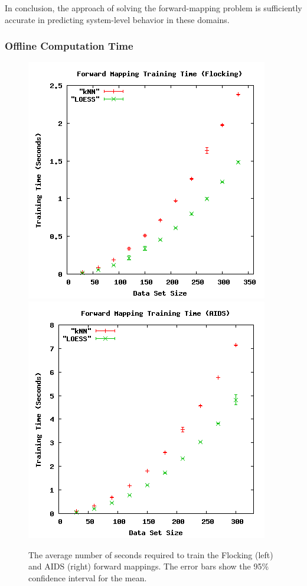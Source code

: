 In conclusion, the \fw approach of solving the forward-mapping problem is sufficiently accurate in predicting system-level behavior in these domains.

  \subsubsection{Offline Computation Time}

\begin{figure}[ht]
\centering
\includegraphics[scale=.4]{images/results_flocking/fmtraining.png}
\includegraphics[scale=.4]{images/results_aids/aids-fmtraining.png}
\caption{The average number of seconds required to train the Flocking (left) and AIDS (right) forward mappings.
The error bars show the 95\% confidence interval for the mean.}
\label{fig:fmtraining}
\end{figure}

